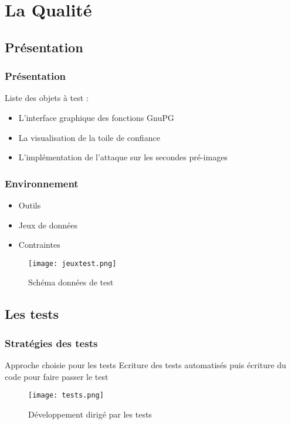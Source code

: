 \section{La Qualité}


\subsection{Présentation}

\begin{frame}
  \frametitle{\color{white} Présentation}
  Liste des objets à test :
  \begin{itemize}
  \item L'interface graphique des fonctions GnuPG
  \item La visualisation de la toile de confiance
  \item L'implémentation de l'attaque sur les secondes pré-images
  \end{itemize}
\end{frame}

\begin{frame}
  \frametitle{\color{white} Environnement}
  \begin{itemize}
  \item Outils
  \item Jeux de données
  \item Contraintes
  \end{itemize}
  \begin{figure}[p]
    \centering
    \texttt{[image: jeuxtest.png]}
    \caption{Schéma données de test}
  \end{figure}
  
\end{frame}



\subsection{Les tests}
\begin{frame}
  \frametitle{\color{white} Stratégies des tests}
  \begin{block}{Approche choisie pour les tests}
   Ecriture des tests automatisés puis écriture du code pour faire passer le test
  \end{block}
  \begin{figure}[p]
    \centering
    \texttt{[image: tests.png]}
    \caption{Développement dirigé par les tests}
  \end{figure}
\end{frame}

